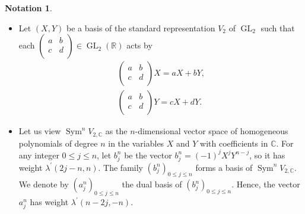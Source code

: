 \documentclass[11pt, a4paper]{amsart}
\theoremstyle{plain}
\theoremstyle{definition}
\newtheorem{notation}[theorem]{Notation}
\numberwithin{equation}{section}
\def\CC{\mathbb{C}}
\def\RR{\mathbb{R}}
\DeclareMathOperator{\Sym}{Sym}
\DeclareMathOperator{\GL}{\mathrm{GL}}
\begin{document}
\begin{notation}
    \begin{itemize}
        \item Let $(X, Y)$ be a basis of the standard representation $V_{2}$ of $\GL_{2}$ such that each $\begin{pmatrix}
                                                                                                    a & b \\
                                                                                                    c & d \\ 
                                                                                                \end{pmatrix} \in \GL_2(\RR)$ acts by 
                    \begin{align*}
                        \begin{pmatrix}
                            a & b \\
                            c & d \\
                        \end{pmatrix} X = aX + bY, \\
                        \begin{pmatrix}
                            a & b \\
                            c & d \\
                        \end{pmatrix} Y = cX + dY. 
                    \end{align*}
        \item Let us view $\Sym^{n}V_{2, \CC}$ as the $n$-dimensional vector space of homogeneous polynomials of degree $n$ in the variables $X$ and $Y$ with coefficients in $\CC$. For any integer $0 \le j \le n$, let $b_{j}^{n}$ be the vector $b_{j}^{n} = (-1)^{j}X^{j}Y^{n-j}$, so it has weight $\lambda^{\prime}(2j - n, n)$. The family $(b_{j}^{n})_{0 \le j \le n}$ forms a basis of $\Sym^{n}V_{2, \CC}$. We denote by $(a_{j}^{n})_{0 \le j \le n}$ the dual basis of $(b_{j}^{n})_{0 \le j \le n}$. Hence, the vector $a_{j}^{n}$ has weight $\lambda^{\prime}(n - 2j, -n)$.
    \end{itemize}
\end{notation}
\end{document}
